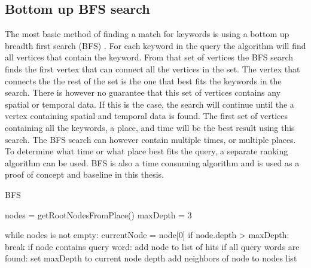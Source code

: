\subsection{Bottom up BFS search}
The most basic method of finding a match for keywords is using a bottom up breadth first search (BFS) \cite{He:2007:BRK:1247480.1247516}. For each keyword in the query the algorithm will find all vertices that contain the keyword. From that set of vertices the BFS search finds the first vertex that can connect all the vertices in the set. The vertex that connects the the rest of the set is the one that best fits the keywords in the search. There is however no guarantee that this set of vertices contains any spatial or temporal data. If this is the case, the search will continue until the a vertex containing spatial and temporal data is found. The first set of vertices containing all the keywords, a place, and time will be the best result using this search. The BFS search can however contain multiple times, or multiple places. To determine what time or what place best fits the query, a separate ranking algorithm can be used. BFS is also a time consuming algorithm and is used as a proof of concept and baseline in this thesis.

\begin{algorithm}
\caption{BFS}
\begin{algorithmic}[1]
nodes = getRootNodesFromPlace()
maxDepth = 3

while nodes is not empty:
	currentNode = node[0]
	if node.depth > maxDepth: break
	if node contains query word:
		add node to list of hits
	if all query words are found:
		set maxDepth to current node depth
	add neighbors of node to nodes list
\EndProcedure
\end{algorithmic}
\end{algorithm}

